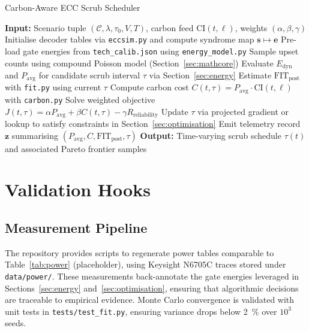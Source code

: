 \documentclass[conference]{IEEEtran}
\begin{document}
\begin{algorithm}[!t]
    \caption{Carbon-Aware ECC Scrub Scheduler}
    \label{alg:carbonaware}
    \begin{algorithmic}[1]
        \STATE \textbf{Input:} Scenario tuple $(\mathcal{C}, \lambda, \tau_{0}, V, T)$, carbon feed $\text{CI}(t,\ell)$, weights $(\alpha,\beta,\gamma)$
        \STATE Initialise decoder tables via \texttt{eccsim.py} and compute syndrome map $\mathbf{s}\mapsto \mathbf{e}$
        \STATE Pre-load gate energies from \texttt{tech\_calib.json} using \texttt{energy\_model.py}
            \STATE Sample upset counts using compound Poisson model (Section~\ref{sec:mathcore})
            \STATE Evaluate $E_{\text{dyn}}$ and $P_{\text{avg}}$ for candidate scrub interval $\tau$ via Section~\ref{sec:energy}
            \STATE Estimate $\text{FIT}_{\text{post}}$ with \texttt{fit.py} using current $\tau$
            \STATE Compute carbon cost $C(t,\tau)=P_{\text{avg}} \cdot \text{CI}(t,\ell)$ with \texttt{carbon.py}
            \STATE Solve weighted objective $J(t,\tau)=\alpha P_{\text{avg}}+\beta C(t,\tau)-\gamma R_{\text{reliability}}$
            \STATE Update $\tau$ via projected gradient or lookup to satisfy constraints in Section~\ref{sec:optimisation}
            \STATE Emit telemetry record $\mathbf{z}$ summarising $(P_{\text{avg}}, C, \text{FIT}_{\text{post}}, \tau)$
        \ENDFOR
        \STATE \textbf{Output:} Time-varying scrub schedule $\tau(t)$ and associated Pareto frontier samples
    \end{algorithmic}
\end{algorithm}

\section{Validation Hooks}
\subsection{Measurement Pipeline}
The repository provides scripts to regenerate power tables comparable to Table~\ref{tab:power} (placeholder), using Keysight N6705C traces stored under \texttt{data/power/}.
These measurements back-annotate the gate energies leveraged in Sections~\ref{sec:energy} and~\ref{sec:optimisation}, ensuring that algorithmic decisions are traceable to empirical evidence.
Monte Carlo convergence is validated with unit tests in \texttt{tests/test\_fit.py}, ensuring variance drops below \SI{2}{\percent} over $10^{3}$ seeds.
\end{document}
